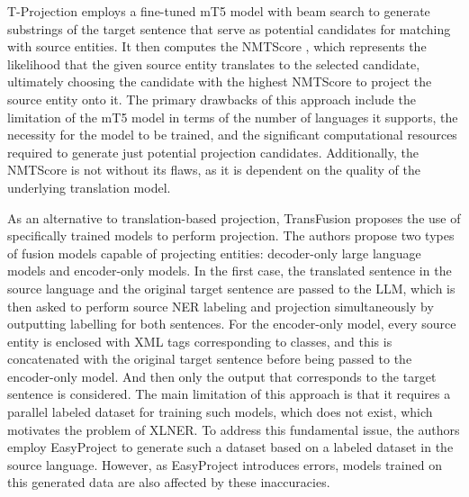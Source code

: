 T-Projection \cite{garcia-ferrero-etal-2023-projection} employs a fine-tuned mT5 \cite{xue-etal-2021-mt5}
model with beam search to generate substrings of the target sentence that serve as potential candidates for matching
with source entities. It then computes the NMTScore \cite{vamvas_sennrich_2022_nmtscore}, which
represents the likelihood that the given source entity translates to the selected candidate, ultimately
choosing the candidate with the highest NMTScore to project the source entity onto it. The primary
drawbacks of this approach include the limitation of the mT5 model in terms of the number of languages
it supports, the necessity for the model to be trained, and the significant computational resources
required to generate just potential projection candidates. Additionally, the NMTScore is not without its
flaws, as it is dependent on the quality of the underlying translation model.

As an alternative to translation-based projection, TransFusion \cite{transfusion} proposes the use of
specifically trained models to perform projection. The authors propose two types of fusion
models capable of projecting entities: decoder-only large language models and encoder-only models.
In the first case, the translated sentence in the source language and the original target sentence are
passed to the LLM, which is then asked to perform source NER labeling and projection simultaneously
by outputting labelling for both sentences. For the encoder-only model, every source entity is enclosed
with XML tags corresponding to classes, and this is concatenated with the original target sentence
before being passed to the encoder-only model. And then only the output that corresponds to the
target sentence is considered. The main limitation of this approach is that it requires a parallel labeled dataset
for training such models, which does not exist, which motivates the problem of XLNER. To address this fundamental issue, the
authors employ EasyProject to generate such a dataset based on a labeled dataset in the source
language. However, as EasyProject introduces errors, models trained on this generated data are also
affected by these inaccuracies.

